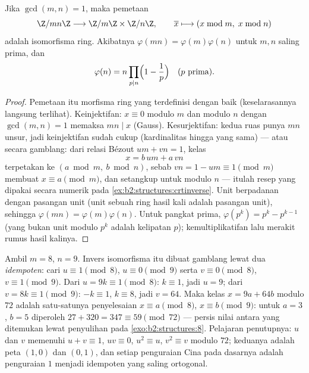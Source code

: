 \begin{theorem}\label{thm:b2:structures:crt}
Jika $\gcd(m, n) = 1$, maka pemetaan
\[
\Z/mn\Z \longrightarrow \Z/m\Z \times \Z/n\Z,
\qquad
\overline{x} \longmapsto (x \bmod m,\; x \bmod n)
\]
adalah isomorfisma ring. Akibatnya
$\varphi(mn) = \varphi(m)\varphi(n)$ untuk $m, n$ saling prima, dan
\[
\varphi(n) = n \prod_{p \mid n} \Bigl(1 - \frac 1p\Bigr)
\quad (p \text{ prima}).
\]
\end{theorem}

\begin{proof}
Pemetaan itu morfisma ring yang terdefinisi dengan baik (keselarasannya
langsung terlihat). Keinjektifan: $x \equiv 0$ modulo $m$ dan modulo $n$
dengan $\gcd(m,n) = 1$ memaksa $mn \mid x$ (Gauss). Kesurjektifan: kedua
ruas punya $mn$ unsur, jadi keinjektifan sudah cukup (kardinalitas hingga
yang sama) --- atau secara gamblang: dari relasi Bézout $um +
vn = 1$, kelas
\[
x = b\,um + a\,vn
\]
terpetakan ke $(a \bmod m,\ b \bmod n)$, sebab $vn = 1 - um \equiv 1
\pmod m$ membuat $x \equiv a \pmod m$, dan setangkup untuk modulo $n$
--- itulah resep yang dipakai secara numerik pada
\cref{ex:b2:structures:crtinverse}. Unit berpadanan dengan pasangan unit
(unit sebuah ring hasil kali adalah pasangan unit), sehingga $\varphi(mn) =
\varphi(m)\varphi(n)$. Untuk pangkat prima, $\varphi(p^k) = p^k -
p^{k-1}$ (yang bukan unit modulo $p^k$ adalah kelipatan $p$);
kemultiplikatifan lalu merakit rumus hasil kalinya.
\end{proof}

\begin{example}\label{ex:b2:structures:crtinverse}
Ambil $m = 8$, $n = 9$. Invers isomorfisma itu dibuat gamblang
lewat dua \emph{idempoten}: cari $u \equiv 1 \pmod 8$,
$u \equiv 0 \pmod 9$ serta $v \equiv 0 \pmod 8$, $v \equiv 1 \pmod
9$. Dari $u = 9k \equiv 1 \pmod 8$: $k \equiv 1$, jadi $u = 9$; dari
$v = 8k \equiv 1 \pmod 9$: $-k \equiv 1$, $k \equiv 8$, jadi $v =
64$. Maka kelas $x = 9a + 64b$ modulo $72$ adalah satu-satunya
penyelesaian $x \equiv a \pmod 8$, $x \equiv b \pmod 9$: untuk $a =
3$, $b = 5$ diperoleh $27 + 320 = 347 \equiv 59 \pmod{72}$ ---
persis nilai antara yang ditemukan lewat penyulihan pada
\cref{exo:b2:structures:8}. Pelajaran penutupnya: $u$ dan $v$
memenuhi $u + v \equiv 1$, $uv \equiv 0$, $u^2 \equiv u$, $v^2
\equiv v$ modulo $72$; keduanya adalah peta $(1, 0)$ dan $(0,
1)$, dan setiap penguraian Cina pada dasarnya adalah penguraian
$1$ menjadi idempoten yang saling ortogonal.
\end{example}

